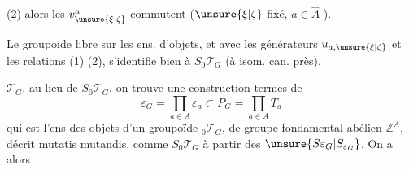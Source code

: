 (2) 
alors les $v^a_{\unsure{\xi|\zeta}}$ commutent ($\unsure{\xi|\zeta}$ fixé, $a\in\widehat{A}$ ).

Le groupoïde libre sur les   ens. d'objets, et avec les générateurs $u_{a,\unsure{\xi|\zeta}}$ et les relations (1) (2),  s'identifie bien à $S_0\mathcal{T}_G$ (à isom. can. près).

 $\mathcal{T}_G$, au  lieu de $S_0\mathcal{T}_G$, on trouve une construction    termes de 
\[
\varepsilon_G=\prod_{a\in A}\varepsilon_a\subset P_G=\prod_{a\in A}T_a
\]
qui est l'ens des objets d'un groupoïde  ${}_0\mathcal{T}_G$,  de groupe fondamental abélien $\mathbb{Z}^A$, décrit mutatis mutandis, comme $S_0\mathcal{T}_G$ à partir des $\unsure{S\varepsilon_G|S_{\varepsilon_G}}$. On a alors
